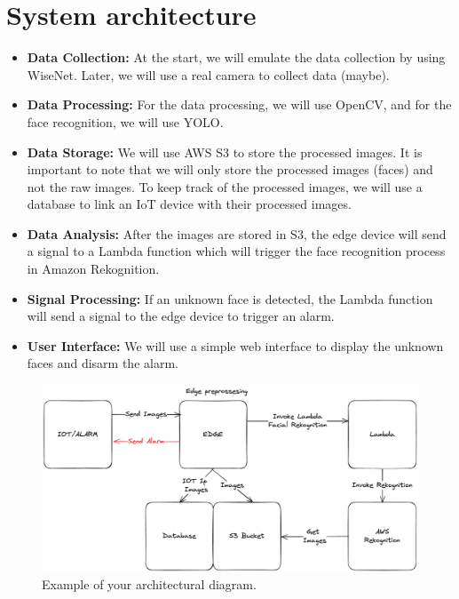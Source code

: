 \documentclass[conference]{IEEEtran}
\begin{document}
\section{System architecture}
\begin{itemize}
    \item \textbf{Data Collection:} At the start, we will emulate the data collection by using WiseNet. Later, we will use a real camera to collect data (maybe).
    \item \textbf{Data Processing:} For the data processing, we will use OpenCV, and for the face recognition, we will use YOLO.
    \item \textbf{Data Storage:} We will use AWS S3 to store the processed images. It is important to note that we will only store the processed images (faces) 
                                    and not the raw images. To keep track of the processed images, we will use a database to link an IoT device with their processed images.
    \item \textbf{Data Analysis:} After the images are stored in S3, the edge device will send a signal to a Lambda function which will trigger the face recognition 
                                    process in Amazon Rekognition.
    \item \textbf{Signal Processing:} If an unknown face is detected, the Lambda function will send a signal to the edge device to trigger an alarm.
    \item \textbf{User Interface:} We will use a simple web interface to display the unknown faces and disarm the alarm.
\end{itemize}

\begin{figure}[h!]
    \centering
    \includegraphics[width=1\linewidth]{images/architecture.excalidraw.png}
    \caption{Example of your architectural diagram.}
    \label{fig:enter-label}
\end{figure}
\end{document}
